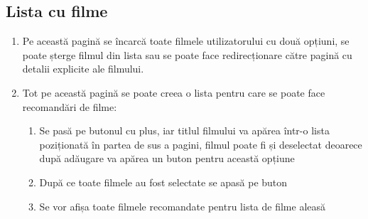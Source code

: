 \subsection{Lista cu filme}

\begin{enumerate}
  	\item Pe această pagină se încarcă toate filmele utilizatorului cu două opțiuni, se poate șterge filmul din lista sau se poate face redirecționare către pagină cu detalii explicite ale filmului.
	\item Tot pe această pagină se poate creea o lista pentru care se poate face recomandări de filme:
			\begin{enumerate}
		  	\item Se pasă pe butonul cu plus, iar titlul filmului va apărea într-o lista poziționată în partea de sus a pagini, filmul poate fi și deselectat deoarece după adăugare va apărea un buton pentru această opțiune
			\item  După ce toate filmele au fost selectate se apasă pe buton
			\item Se vor afișa toate filmele recomandate pentru lista de filme aleasă
		\end{enumerate}
	


\end{enumerate}
